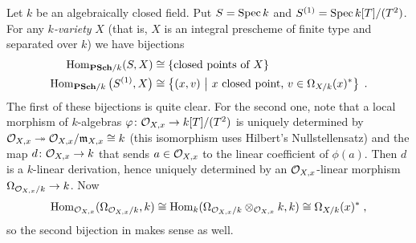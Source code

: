 \documentclass[a4paper,parskip=half,numbers=enddot, DIV=12]{scrreprt}
\begin{document}
\begin{rem}
	Let $k$ be an algebraically closed field. Put $S=\operatorname{Spec} k$ and $S^{(1)}=\operatorname{Spec} k[T]/(T^2)$. For any \emph{$k$-variety} $X$ (that is, $X$ is an integral prescheme of finite type and separated over $k$) we have bijections
	\begin{align}\lbl{eq:ZariskiTangentSpace}
		\begin{split}
			\Hom_{\cat{PSch}/k}(S,X)&\cong\left\{\text{closed points of }X\right\}\\
			\Hom_{\cat{PSch}/k}\big(S^{(1)},X\big)&\cong\left\{(x,v)\st x\text{ closed point, }v\in\Omega_{X/k}(x)^*\right\}\;.
		\end{split}
	\end{align}
	The first of these bijections is quite clear. For the second one, note that a local  morphism of $k$-algebras $\phi\colon \Oo_{X,x}\morphism k[T]/(T^2)$ is uniquely determined by $\Oo_{X,x}\epimorphism\Oo_{X,x}/\mm_{X,x}\cong k$ (this isomorphism uses Hilbert's Nullstellensatz) and the map $d\colon \Oo_{X,x}\morphism k$ that sends $a\in \mathcal{O}_{X,x}$ to the linear coefficient of $\phi(a)$. Then $d$ is a $k$-linear derivation, hence uniquely determined by an $\mathcal{O}_{X,x}$-linear morphism $\Omega_{\Oo_{X,x}/k}\morphism k$. Now
	\begin{align*}
		\operatorname{Hom}_{\mathcal{O}_{X,x}}(\Omega_{\mathcal{O}_{X,x}/k},k)\cong \operatorname{Hom}_k(\Omega_{\mathcal{O}_{X,x}/k}\otimes_{\mathcal{O}_{X,x}}k,k)\cong \Omega_{X/k}(x)^*\;, 
	\end{align*}
	so the second bijection in  makes sense as well.
	

\end{rem}
\end{document}
